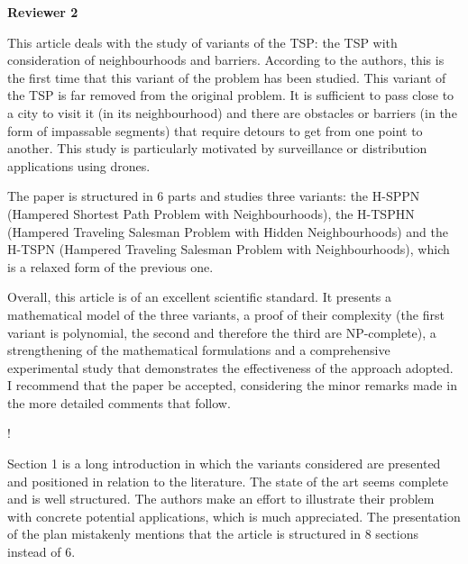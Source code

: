 \documentclass{article}
\newenvironment{reviewer}{\setcounter{pointcounter}{1}}{}
\newcommand{\point}{\text{{\selectfont \thepointcounter} \stepcounter{pointcounter}}}
\begin{document}
	\begin{reviewer}
		
		\begin{tcolorbox}[breakable,enhanced,coltitle=black,colback=green!75!black,colframe=green!75!black,borderline={1pt}{0pt}{black},boxrule=0pt]
			\textbf{Reviewer 2}
		\end{tcolorbox}
		
		\begin{itshape}
			This article deals with the study of variants of the TSP: the TSP with consideration of neighbourhoods and barriers. According to the authors, this is the first time that this variant of the problem has been studied. This variant of the TSP is far removed from the original problem. It is sufficient to pass close to a city to visit it (in its neighbourhood) and there are obstacles or barriers (in the form of impassable segments) that require detours to get from one point to another. This study is particularly motivated by surveillance or distribution applications using drones.
			
			The paper is structured in 6 parts and studies three variants: the H-SPPN (Hampered Shortest Path Problem with Neighbourhoods), the H-TSPHN (Hampered Traveling Salesman Problem with Hidden Neighbourhoods) and the H-TSPN (Hampered Traveling Salesman Problem with Neighbourhoods), which is a relaxed form of the previous one.
			
			Overall, this article is of an excellent scientific standard. It presents a mathematical model of the three variants, a proof of their complexity (the first variant is polynomial, the second and therefore the third are NP-complete), a strengthening of the mathematical formulations and a comprehensive experimental study that demonstrates the effectiveness of the approach adopted. I recommend that the paper be accepted, considering the minor remarks made in the more detailed comments that follow.
		\end{itshape}
		
		\begin{tcolorbox}[breakable,enhanced,coltitle=black,colback=green!5!white,colframe=green!75!black,title=\textbf{Answer R2.\point},borderline={1pt}{0pt}{black},boxrule=0pt]!
			
		\end{tcolorbox}
		
		\begin{itshape}
			Section 1 is a long introduction in which the variants considered are presented and positioned in relation to the literature. The state of the art seems complete and is well structured. The authors make an effort to illustrate their problem with concrete potential applications, which is much appreciated. The presentation of the plan mistakenly mentions that the article is structured in 8 sections instead of 6.
		\end{itshape}
		

\end{reviewer}
\end{document}
